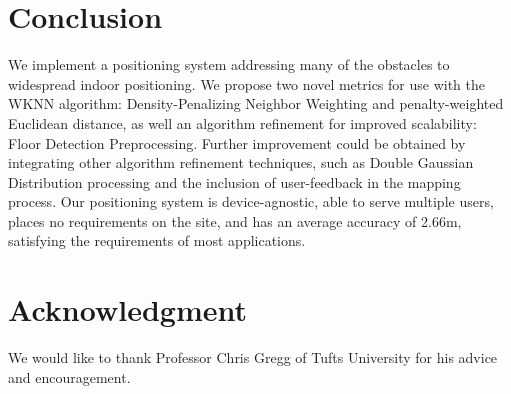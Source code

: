 \documentclass[conference]{IEEEtran}
\begin{document}
\section{Conclusion}
We implement a positioning system addressing many of the obstacles to widespread indoor positioning. We propose two novel metrics for use with the WKNN algorithm: Density-Penalizing Neighbor Weighting and penalty-weighted Euclidean distance, as well an algorithm refinement for improved scalability: Floor Detection Preprocessing. Further improvement could be obtained by integrating other algorithm refinement techniques, such as Double Gaussian Distribution processing and the inclusion of user-feedback in the mapping process. Our positioning system is device-agnostic, able to serve multiple users, places no requirements on the site, and has an average accuracy of 2.66m, satisfying the requirements of most applications.

\section*{Acknowledgment}
We would like to thank Professor Chris Gregg of Tufts University for his advice and encouragement.


\end{document}
